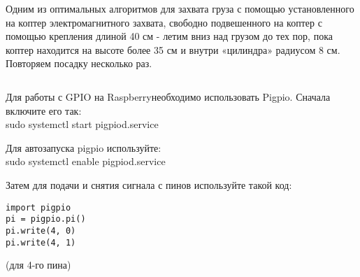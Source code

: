 Одним из оптимальных алгоритмов для захвата груза с помощью установленного на коптер электромагнитного захвата, свободно подвешенного на коптер с помощью крепления длиной 40 см - летим вниз над грузом до тех пор, пока коптер находится на высоте более 35 см и внутри «цилиндра» радиусом 8 см. Повторяем посадку несколько раз.

\inputminted[fontsize=\footnotesize, linenos]{python}{final/command_tour/ats/task_08/source_5.py}

Для работы с GPIO на Raspberryнеобходимо использовать Pigpio. Сначала включите его так:\\
sudo systemctl start pigpiod.service
 
Для автозапуска pigpio используйте:\\
sudo systemctl enable pigpiod.service

Затем для подачи и снятия сигнала с пинов используйте такой код:

\begin{verbatim}
import pigpio
pi = pigpio.pi()
pi.write(4, 0)
pi.write(4, 1)
\end{verbatim}

(для 4-го пина)